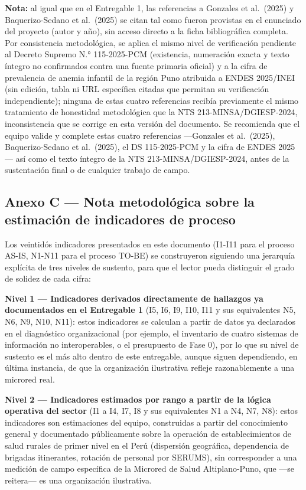 \documentclass[11pt,a4paper]{article}
\begin{document}
\textbf{Nota:} al igual que en el Entregable 1, las referencias a Gonzales et al.~(2025) y Baquerizo-Sedano et al.~(2025) se citan tal como fueron provistas en el enunciado del proyecto (autor y año), sin acceso directo a la ficha bibliográfica completa. Por consistencia metodológica, se aplica el mismo nivel de verificación pendiente al Decreto Supremo N.° 115-2025-PCM (existencia, numeración exacta y texto íntegro no confirmados contra una fuente primaria oficial) y a la cifra de prevalencia de anemia infantil de la región Puno atribuida a ENDES 2025/INEI (sin edición, tabla ni URL específica citadas que permitan su verificación independiente); ninguna de estas cuatro referencias recibía previamente el mismo tratamiento de honestidad metodológica que la NTS 213-MINSA/DGIESP-2024, inconsistencia que se corrige en esta versión del documento. Se recomienda que el equipo valide y complete estas cuatro referencias ---Gonzales et al.~(2025), Baquerizo-Sedano et al.~(2025), el DS 115-2025-PCM y la cifra de ENDES 2025--- así como el texto íntegro de la NTS 213-MINSA/DGIESP-2024, antes de la sustentación final o de cualquier trabajo de campo.

\subsection{Anexo C --- Nota metodológica sobre la estimación de indicadores de proceso}\label{anexo-c-nota-metodoluxf3gica-sobre-la-estimaciuxf3n-de-indicadores-de-proceso}

Los veintidós indicadores presentados en este documento (I1-I11 para el proceso AS-IS, N1-N11 para el proceso TO-BE) se construyeron siguiendo una jerarquía explícita de tres niveles de sustento, para que el lector pueda distinguir el grado de solidez de cada cifra:

\textbf{Nivel 1 --- Indicadores derivados directamente de hallazgos ya documentados en el Entregable 1} (I5, I6, I9, I10, I11 y sus equivalentes N5, N6, N9, N10, N11): estos indicadores se calculan a partir de datos ya declarados en el diagnóstico organizacional (por ejemplo, el inventario de cuatro sistemas de información no interoperables, o el presupuesto de Fase 0), por lo que su nivel de sustento es el más alto dentro de este entregable, aunque siguen dependiendo, en última instancia, de que la organización ilustrativa refleje razonablemente a una microred real.

\textbf{Nivel 2 --- Indicadores estimados por rango a partir de la lógica operativa del sector} (I1 a I4, I7, I8 y sus equivalentes N1 a N4, N7, N8): estos indicadores son estimaciones del equipo, construidas a partir del conocimiento general y documentado públicamente sobre la operación de establecimientos de salud rurales de primer nivel en el Perú (dispersión geográfica, dependencia de brigadas itinerantes, rotación de personal por SERUMS), sin corresponder a una medición de campo específica de la Microred de Salud Altiplano-Puno, que ---se reitera--- es una organización ilustrativa.
\end{document}
